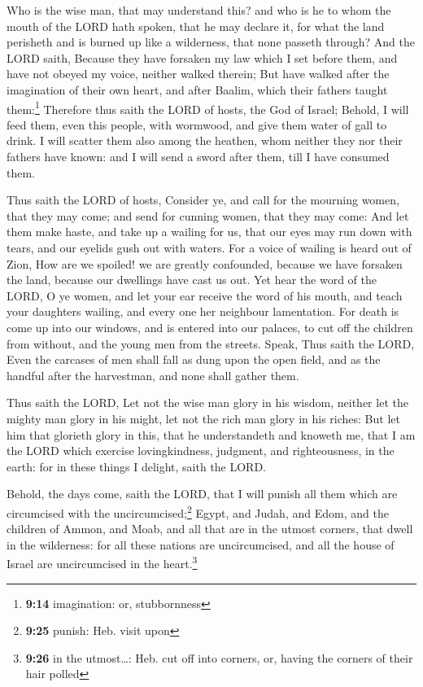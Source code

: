  Who is the wise man, that may understand this? and who
is he to whom the mouth of the LORD hath spoken, that he may declare it,
for what the land perisheth and is burned up like a wilderness, that
none passeth through?  And the LORD saith, Because they
have forsaken my law which I set before them, and have not obeyed my
voice, neither walked therein;  But have walked after the
imagination of their own heart, and after Baalim, which their fathers
taught them:\footnote{\textbf{9:14} imagination: or, stubbornness}
 Therefore thus saith the LORD of hosts, the God of
Israel; Behold, I will feed them, even this people, with wormwood, and
give them water of gall to drink.  I will scatter them
also among the heathen, whom neither they nor their fathers have known:
and I will send a sword after them, till I have consumed them.

 Thus saith the LORD of hosts, Consider ye, and call for
the mourning women, that they may come; and send for cunning women, that
they may come:  And let them make haste, and take up a
wailing for us, that our eyes may run down with tears, and our eyelids
gush out with waters.  For a voice of wailing is heard
out of Zion, How are we spoiled! we are greatly confounded, because we
have forsaken the land, because our dwellings have cast us out.
 Yet hear the word of the LORD, O ye women, and let your
ear receive the word of his mouth, and teach your daughters wailing, and
every one her neighbour lamentation.  For death is come
up into our windows, and is entered into our palaces, to cut off the
children from without, and the young men from the streets.
 Speak, Thus saith the LORD, Even the carcases of men
shall fall as dung upon the open field, and as the handful after the
harvestman, and none shall gather them.

 Thus saith the LORD, Let not the wise man glory in his
wisdom, neither let the mighty man glory in his might, let not the rich
man glory in his riches:  But let him that glorieth glory
in this, that he understandeth and knoweth me, that I am the LORD which
exercise lovingkindness, judgment, and righteousness, in the earth: for
in these things I delight, saith the LORD.

 Behold, the days come, saith the LORD, that I will
punish all them which are circumcised with the uncircumcised;\footnote{\textbf{9:25}
  punish: Heb. visit upon}  Egypt, and Judah, and Edom,
and the children of Ammon, and Moab, and all that are in the utmost
corners, that dwell in the wilderness: for all these nations are
uncircumcised, and all the house of Israel are uncircumcised in the
heart.\footnote{\textbf{9:26} in the utmost\ldots: Heb. cut off into
  corners, or, having the corners of their hair polled}

